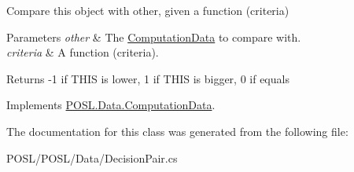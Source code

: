 Compare this object with other, given a function (criteria) 


\begin{DoxyParams}{Parameters}
{\em other} & The \hyperlink{classPOSL_1_1Data_1_1ComputationData}{Computation\+Data} to compare with. \\
\hline
{\em criteria} & A function (criteria). \\
\hline
\end{DoxyParams}
\begin{DoxyReturn}{Returns}
-\/1 if T\+H\+IS is lower, 1 if T\+H\+IS is bigger, 0 if equals 
\end{DoxyReturn}


Implements \hyperlink{classPOSL_1_1Data_1_1ComputationData_a6cca889bb4ce32104d91dba413ef8c56}{P\+O\+S\+L.\+Data.\+Computation\+Data}.



The documentation for this class was generated from the following file\+:\begin{DoxyCompactItemize}
\item 
P\+O\+S\+L/\+P\+O\+S\+L/\+Data/Decision\+Pair.\+cs\end{DoxyCompactItemize}
